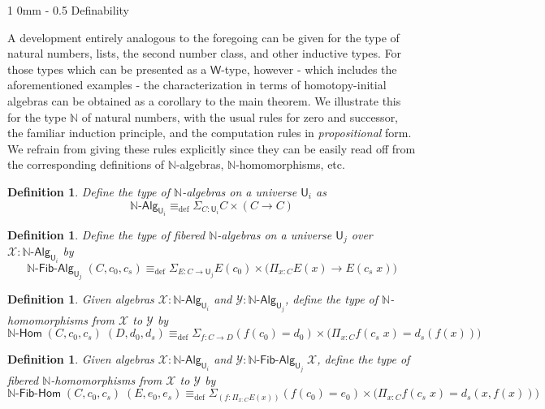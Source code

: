 \documentclass[reqno,10pt,a4paper,oneside]{amsart}
\makeatletter
\numberwithin{equation}{section}
\renewcommand{\section}{\@startsection
  {section}%
   {1}%
  {0mm}%
   {-\baselineskip}%
  {0.5\baselineskip}%
   {\Large\bfseries}}%
\theoremstyle{mythm}
\theoremstyle{mydef}
\newtheorem{definition}[theorem]{Definition}
\theoremstyle{myrmk}
\newcommand{\deq}{\equiv}
\newcommand{\defeq}{\deq_{\mathrm{def}}}
\newcommand{\prd}[1]{\Pi_{#1}}
\newcommand{\sm}[1]{\Sigma_{#1}}
\newcommand{\nat}{\ensuremath{\mathbb{N}}}
\newcommand{\W}{\mathsf{W}}
\newcommand{\UU}{\mathsf{U}}
\newcommand{\NatAlg}{\nat\text{-}\mathsf{Alg}}
\newcommand{\NatHom}{\nat\text{-}\mathsf{Hom}}
\newcommand{\NatFibAlg}{\nat\text{-}\mathsf{Fib}\text{-}\mathsf{Alg}}
\newcommand{\NatFibHom}{\nat\text{-}\mathsf{Fib}\text{-}\mathsf{Hom}}
\newcommand{\X}{\mathcal{X}}
\newcommand{\Y}{\mathcal{Y}}
\makeatother
\begin{document}
\section{Definability}
\label{sec:definability}

A development entirely analogous to the foregoing can be given for the type of natural numbers, lists, the second number class, and other inductive types. For those types which can be presented as a $\W$-type, however - which includes the aforementioned examples - the characterization in terms of homotopy-initial algebras can be obtained as a corollary to the main theorem. We illustrate this for the type $\nat$ of natural numbers, with the usual rules for zero and successor, the familiar induction principle, and the computation rules in \emph{propositional} form. We refrain from giving these rules explicitly since they can be easily read off from the corresponding definitions of $\nat$-algebras, $\nat$-homomorphisms, etc.

\begin{definition}\label{def:NatAlg}
Define the type of \emph{$\nat$-algebras} on a universe $\UU_i$ as 
\[\NatAlg_{\UU_i} \defeq \sm{C : \UU_i} C \times (C \to C) \]
\end{definition}

\begin{definition}\label{def:NatFibAlg}
Define the type of \emph{fibered $\nat$-algebras} on a universe $\UU_j$ over $\mathcal{X} : \NatAlg_{\UU_i}$ by
\[\NatFibAlg_{\UU_j} \; (C,c_0,c_s) \defeq \sm{E : C \to \UU_j} E(c_0) \times \big(\prd{x:C} E(x) \to E(c_s \; x)\big) \]
\end{definition}

\begin{definition}\label{def:NatHom}
Given algebras $\X : \NatAlg_{\UU_i}$ and $\Y : \NatAlg_{\UU_j}$, define the type of \emph{$\nat$-homomorphisms} from $\X$ to $\Y$ by 
\[\NatHom \; (C,c_0,c_s) \; (D,d_0,d_s) \defeq \sm{f:C \to D} (f(c_0) = d_0) \times \big(\prd{x:C} f(c_s\;x) = d_s(f(x))\big) \]
\end{definition}

\begin{definition}\label{def:NatFibHom}
Given algebras $\X : \NatAlg_{\UU_i}$ and $\Y : \NatFibAlg_{\UU_j} \; \X$, define the type of \emph{fibered $\nat$-homomorphisms} from $\X$ to $\Y$ by
\[\NatFibHom \; (C,c_0,c_s) \; (E,e_0,e_s) \defeq \sm{(f:\prd{x:C} E(x))} (f(c_0) = e_0) \times \big(\prd{x:C} f(c_s\;x) = d_s(x,f(x))\big) \]
\end{definition}
\end{document}
